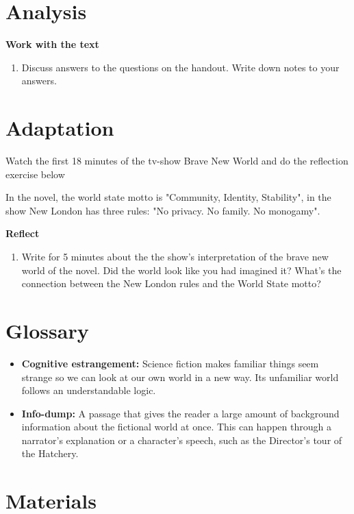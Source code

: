 \documentclass[11pt,a4paper,oneside]{book}
\newcommand{\tasktitle}[1]{{\color{blue}\bfseries #1}\par\smallskip}
\begin{document}
\section*{Analysis}
\begin{taskbox}
\tasktitle{Work with the text}
\begin{enumerate}
\item Discuss answers to the questions on the handout. Write down notes to your answers.
\end{enumerate}
\end{taskbox}

\section*{Adaptation}
Watch the first 18 minutes of the tv-show Brave New World and do the reflection exercise below

In the novel, the world state motto is "Community, Identity, Stability", in the show New London has three rules: "No privacy. No family. No monogamy".

\begin{taskbox}
\tasktitle{Reflect}
\begin{enumerate}
\item Write for 5 minutes about the the show's interpretation of the brave new world of the novel. Did the world look like you had imagined it? What's the connection between the New London rules and the World State motto?
\end{enumerate}
\end{taskbox}

\section*{Glossary}

\begin{itemize}
\item \textbf{Cognitive estrangement:} Science fiction makes familiar things seem strange so we can look at our own world in a new way. Its unfamiliar world follows an understandable logic.
\item \textbf{Info-dump:} A passage that gives the reader a large amount of background information about the fictional world at once. This can happen through a narrator’s explanation or a character’s speech, such as the Director’s tour of the Hatchery.
\end{itemize}

\section*{Materials}
\end{document}
